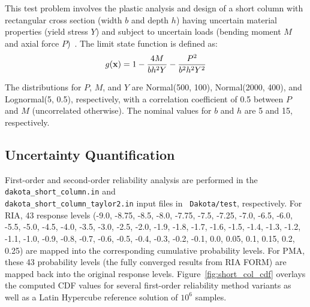 This test problem involves the plastic analysis and design of a short
column with rectangular cross section (width $b$ and depth $h$) having
uncertain material properties (yield stress $Y$) and subject to
uncertain loads (bending moment $M$ and axial force $P$)~\cite{Kus97}.
The limit state function is defined as:
\begin{equation}
g({\bf x}) = 1 - \frac{4M}{b h^2 Y} - \frac{P^2}{b^2 h^2 Y^2}
\end{equation}

The distributions for $P$, $M$, and $Y$ are Normal(500, 100),
Normal(2000, 400), and Lognormal(5, 0.5), respectively, with a
correlation coefficient of 0.5 between $P$ and $M$ (uncorrelated
otherwise).  The nominal values for $b$ and $h$ are 5 and 15,
respectively.

\subsection{Uncertainty Quantification}

First-order and second-order reliability analysis are performed in the
\texttt{dakota\_short\_column.in} and \\
\texttt{dakota\_short\_column\_taylor2.in} input files in {\tt
Dakota/test}, respectively.  For RIA, 43 response levels (-9.0, -8.75,
-8.5, -8.0, -7.75, -7.5, -7.25, -7.0, -6.5, -6.0, -5.5, -5.0, -4.5,
-4.0, -3.5, -3.0, -2.5, -2.0, -1.9, -1.8, -1.7, -1.6, -1.5, -1.4,
-1.3, -1.2, -1.1, -1.0, -0.9, -0.8, -0.7, -0.6, -0.5, -0.4, -0.3,
-0.2, -0.1, 0.0, 0.05, 0.1, 0.15, 0.2, 0.25) are mapped into the
corresponding cumulative probability levels.  For PMA, these 43
probability levels (the fully converged results from RIA FORM) are
mapped back into the original response levels.
Figure~\ref{fig:short_col_cdf} overlays the computed CDF values for
several first-order reliability method variants as well as a Latin
Hypercube reference solution of $10^6$ samples.

